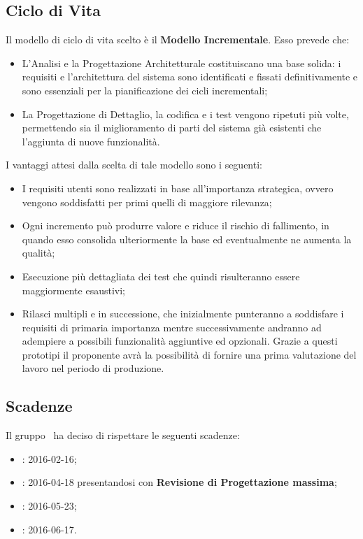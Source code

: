\subsection{Ciclo di Vita}
Il modello di ciclo di vita scelto è il \textbf{Modello Incrementale}. Esso prevede che:
\begin{itemize}
	\item L'Analisi e la Progettazione Architetturale costituiscano una base solida: i requisiti e l'architettura del sistema sono identificati e fissati definitivamente e sono essenziali per la pianificazione dei cicli incrementali;
	\item La Progettazione di Dettaglio, la codifica e i test vengono ripetuti più volte, permettendo sia il miglioramento di parti del sistema già esistenti che l'aggiunta di nuove funzionalità.
\end{itemize}
I vantaggi attesi dalla scelta di tale modello sono i seguenti:
\begin{itemize}
	\item I requisiti utenti sono realizzati in base all'importanza strategica, ovvero vengono soddisfatti per primi quelli di maggiore rilevanza;
	\item Ogni incremento può produrre valore e riduce il rischio di fallimento, in quando esso consolida ulteriormente la base ed eventualmente ne aumenta la qualità;
	\item Esecuzione più dettagliata dei test che quindi risulteranno essere maggiormente esaustivi;
	\item Rilasci multipli e in successione, che inizialmente punteranno a soddisfare i requisiti di primaria importanza mentre successivamente andranno ad adempiere a possibili funzionalità aggiuntive ed opzionali. Grazie a questi prototipi il proponente avrà la possibilità di fornire una prima valutazione del lavoro nel periodo di produzione.
\end{itemize}
\subsection{Scadenze}
Il gruppo \gruppo\ ha deciso di rispettare le seguenti scadenze:
\begin{itemize}
	\item \textbf{\RR}: 2016-02-16;
	\item \textbf{\RP}: 2016-04-18 presentandosi con \textbf{Revisione di Progettazione massima};
	\item \textbf{\RQ}: 2016-05-23;
	\item \textbf{\RA}: 2016-06-17.
\end{itemize}
